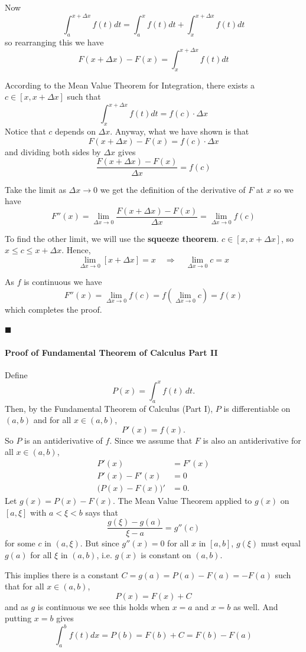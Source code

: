 Now
$$\int_a^{x + \Delta x} f(t)dt = \int_a^x f(t)dt + \int_x^{x + \Delta x} f(t)dt$$
so rearranging this we have
$$F(x + \Delta x) - F(x) = \int_x^{x + \Delta x} f(t)dt$$

According to the Mean Value Theorem for Integration, there exists a $c \in [x,x+\Delta x]$ such that
$$\int_x^{x+\Delta x} f(t)dt = f(c) \cdot \Delta x$$
Notice that $c$ depends on $\Delta x$. Anyway, what we have shown is that
$$F(x + \Delta x) - F(x) = f(c) \cdot \Delta x$$
and dividing both sides by $\Delta x$ gives
$$\frac{F(x + \Delta x) - F(x)}{\Delta x} = f(c)$$

Take the limit as $\Delta x \to 0$ we get the definition of the derivative of $F$ at $x$ so we have
$$F''(x) = \lim_{\Delta x \to 0} \frac{F(x + \Delta x) - F(x)}{\Delta x} = \lim_{\Delta x \to 0} f(c)$$

To find the other limit, we will use the \textbf{squeeze theorem}. $c \in [x,x+\Delta x]$, so $x \le c \le x + \Delta x$. Hence,
$$\lim_{\Delta x \to 0} \left[x + \Delta x\right] = x \quad \Rightarrow \quad \lim_{\Delta x \to 0} c = x$$

As $f$ is continuous we have
$$F''(x) = \lim_{\Delta x \to 0} f(c) = f\left(\lim_{\Delta x \to 0} c\right) = f(x)$$
which completes the proof.

$\blacksquare$

\paragraph{Proof of Fundamental Theorem of Calculus Part II}

Define 
\[
P(x) = \int_a^x f(t)\,dt.
\]
Then, by the Fundamental Theorem of Calculus (Part I), $P$ is differentiable on $(a,b)$ and for all $x \in (a,b)$,
\[
P'(x) = f(x).
\]
So $P$ is an antiderivative of $f$. Since we assume that $F$ is also an antiderivative for all $x \in (a,b)$,
\[
\begin{aligned}
P'(x) &= F'(x) \\
P'(x) - F'(x) &= 0 \\
\big(P(x) - F(x)\big)' &= 0.
\end{aligned}
\]
Let $g(x) = P(x) - F(x)$. The Mean Value Theorem applied to $g(x)$ on $[a,\xi]$ with $a < \xi < b$ says that
$$\frac{g(\xi) - g(a)}{\xi - a} = g''(c)$$
for some $c$ in $(a,\xi)$. But since $g''(x) = 0$ for all $x$ in $[a,b]$, $g(\xi)$ must equal $g(a)$ for all $\xi$ in $(a,b)$, i.e. $g(x)$ is constant on $(a,b)$.

This implies there is a constant $C = g(a) = P(a) - F(a) = -F(a)$ such that for all $x \in (a,b)$,
$$P(x) = F(x) + C$$
and as $g$ is continuous we see this holds when $x = a$ and $x = b$ as well. And putting $x = b$ gives
$$\int_a^b f(t)dx = P(b) = F(b) + C = F(b) - F(a)$$


